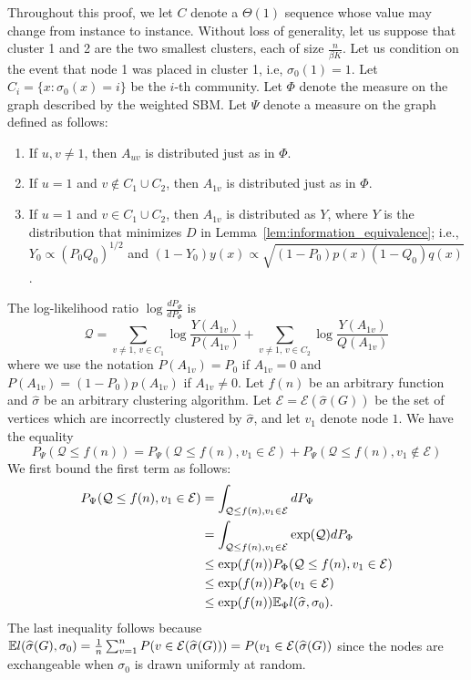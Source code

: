 \documentclass{article}
\begin{document}
Throughout this proof, we let $C$ denote a $\Theta(1)$ sequence whose value may change from instance to instance. Without loss of generality, let us suppose that cluster 1 and 2 are the two smallest clusters, each of size $\frac{n}{\beta K}$. 
Let us condition on the event that node 1 was placed in cluster 1, i.e, $\sigma_0(1) = 1$. Let $C_i = \{x : \sigma_0(x) = i\}$ be the $i$-th community. Let $\Phi$ denote the measure on the graph described by the weighted SBM. Let $\Psi$ denote a measure on the graph defined as follows:
\begin{enumerate}
\item If $u,v \neq 1$, then $A_{uv}$ is distributed just as in $\Phi$. 
\item If $u = 1$ and $v \notin C_1 \cup C_2$, then $A_{1v}$ is distributed just as in $\Phi$.
\item If $u = 1$ and $v \in C_1 \cup C_2$, then $A_{1v}$ is distributed as $Y$, where $Y$ is the distribution that minimizes $D$ in Lemma~\ref{lem:information_equivalence}; i.e., $Y_0 \propto (P_0 Q_0)^{1/2}$ and $(1-Y_0) y(x) \propto \sqrt{(1-P_0)p(x)(1-Q_0) q(x)}$.
\end{enumerate}
The log-likelihood ratio $\log \frac{d P_{\Psi} }{d P_{\Phi}}$ is 
\[
\mathcal{Q} = \sum_{v \neq 1,\, v \in C_1} \log \frac{Y(A_{1v})}{P(A_{1v})} + \sum_{v \neq 1,\, v \in C_2} \log \frac{Y(A_{1v})}{Q(A_{1v})} 
\]
where we use the notation $P(A_{1v}) = P_0$ if $A_{1v} = 0$ and $P(A_{1v}) = (1-P_0)p(A_{1v})$ if $A_{1v} \neq 0$. Let $f(n)$ be an arbitrary function and $\hat{\sigma}$ be an arbitrary clustering algorithm. Let $\mathcal{E} = \mathcal{E}(\hat{\sigma}(G))$ be the set of vertices which are incorrectly clustered by $\hat \sigma$, and let $v_1$ denote node $1$. We have the equality
\[
P_{\Psi}( \mathcal{Q} \leq f(n) ) = P_{\Psi}( \mathcal{Q} \leq f(n), v_1 \in \mathcal{E}) +
 P_{\Psi}( \mathcal{Q} \leq f(n), v_1 \notin \mathcal{E} )
\]
We first bound the first term as follows:
\begin{align*}
P_{\Psi}( \mathcal{Q} \leq f(n), v_1 \in \mathcal{E}) &= \int_{\mathcal{Q} \leq f(n), v_1 \in \mathcal{E}} d P_{\Psi} \\
    &= \int_{\mathcal{Q} \leq f(n), v_1 \in \mathcal{E}} \exp(\mathcal{Q}) d P_{\Phi} \\
    &\leq \exp(f(n)) P_{\Phi}( \mathcal{Q} \leq f(n), v_1 \in \mathcal{E}) \\
    &\leq \exp(f(n)) P_{\Phi}(v_1 \in \mathcal{E}) \\
    &\leq \exp(f(n)) {\mathbb E}_{\Phi}  l(\widehat{\sigma}, \sigma_0).
\end{align*}
The last inequality follows because  ${\mathbb E} l(\widehat{\sigma}(G), \sigma_0) = \frac{1}{n} \sum_{v=1}^n P( v \in \mathcal{E}(\widehat{\sigma}(G)) ) = P(v_1 \in \mathcal{E}(\widehat{\sigma}(G))$ since the nodes are exchangeable when $\sigma_0$ is drawn uniformly at random. 
\end{document}
